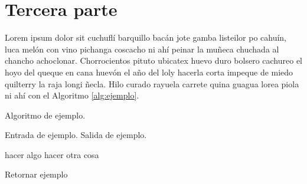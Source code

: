 \section{Tercera parte}
\label{sec:tercera}

Lorem ipsum dolor sit cuchufl\'i barquillo bac\'an jote gamba listeilor po cahu\'in, luca mel\'on con vino pichanga coscacho ni ah\'i peinar la muñeca chuchada al chancho achoclonar. Chorrocientos pituto ubicatex huevo duro bolsero cachureo el hoyo del queque en cana huev\'on el año del loly hacerla corta impeque de miedo quilterry la raja longi ñecla. Hilo curado rayuela carrete quina guagua lorea piola ni ah\'i con el Algoritmo \ref{alg:ejemplo}.

\begin{algorithm}[!ht]
	\caption{Algoritmo de ejemplo.}
	\label{alg:ejemplo}
	\begin{algorithmic}[1]
	\REQUIRE Entrada de ejemplo.
	\ENSURE Salida de ejemplo.	
	
		\STATE hacer algo
	\ELSE
		\STATE hacer otra cosa
	\ENDIF
	
	\RETURN Retornar ejemplo
	
	\end{algorithmic}
\end{algorithm}